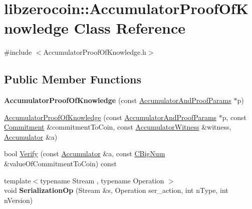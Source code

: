 \hypertarget{classlibzerocoin_1_1_accumulator_proof_of_knowledge}{}\section{libzerocoin\+::Accumulator\+Proof\+Of\+Knowledge Class Reference}
\label{classlibzerocoin_1_1_accumulator_proof_of_knowledge}


{\ttfamily \#include $<$Accumulator\+Proof\+Of\+Knowledge.\+h$>$}

\subsection*{Public Member Functions}
\begin{DoxyCompactItemize}
\item 
\mbox{\label{classlibzerocoin_1_1_accumulator_proof_of_knowledge_a4eb3b653681682cce8a9bc42b231efeb}} 
{\bfseries Accumulator\+Proof\+Of\+Knowledge} (const \mbox{\hyperlink{classlibzerocoin_1_1_accumulator_and_proof_params}{Accumulator\+And\+Proof\+Params}} $\ast$p)
\item 
\mbox{\hyperlink{classlibzerocoin_1_1_accumulator_proof_of_knowledge_acce987e79e2498918495c3a7e8873810}{Accumulator\+Proof\+Of\+Knowledge}} (const \mbox{\hyperlink{classlibzerocoin_1_1_accumulator_and_proof_params}{Accumulator\+And\+Proof\+Params}} $\ast$p, const \mbox{\hyperlink{classlibzerocoin_1_1_commitment}{Commitment}} \&commitment\+To\+Coin, const \mbox{\hyperlink{classlibzerocoin_1_1_accumulator_witness}{Accumulator\+Witness}} \&witness, \mbox{\hyperlink{classlibzerocoin_1_1_accumulator}{Accumulator}} \&a)
\item 
bool \mbox{\hyperlink{classlibzerocoin_1_1_accumulator_proof_of_knowledge_afa37fa003c2e3ce95e00525fe84d1e52}{Verify}} (const \mbox{\hyperlink{classlibzerocoin_1_1_accumulator}{Accumulator}} \&a, const \mbox{\hyperlink{class_c_big_num}{C\+Big\+Num}} \&value\+Of\+Commitment\+To\+Coin) const
\item 
\mbox{\label{classlibzerocoin_1_1_accumulator_proof_of_knowledge_af89207ab552bd8a0474334ff37f8efee}} 
{\footnotesize template$<$typename Stream , typename Operation $>$ }\\void {\bfseries Serialization\+Op} (Stream \&s, Operation ser\+\_\+action, int n\+Type, int n\+Version)
\end{DoxyCompactItemize}
